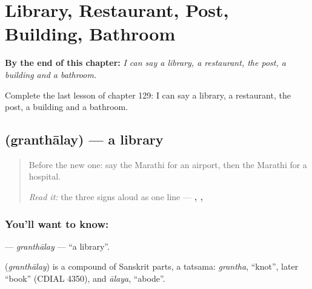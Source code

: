 
\chapter{Library, Restaurant, Post, Building, Bathroom}
\label{ch:mr-library-restaurant-post-building-bathroom}

\begin{chapteropening}
\textbf{By the end of this chapter:} \emph{I can say a library, a restaurant, the post, a building and a bathroom.}

Complete the last lesson of chapter 129: I can say a library, a restaurant, the post, a building and a bathroom.
\end{chapteropening}

\section[\texorpdfstring{\mr{ग्रंथालय} (granthālay)}{ग्रंथालय (granthālay)}]{ (granthālay) — a library}

\label{lesson:MR-C129-granthalay}



\begin{quote}
Before the new one: say the Marathi for an airport, then the Marathi for a hospital.

\emph{Read it:} the three signs aloud as one line — \textbf{, , }
\end{quote}

\subsection*{You'll want to know: }
\textbf{} — \emph{granthālay} — \textquotedblleft{}a library\textquotedblright{}.

\begin{cousinweb}
\textbf{} (\emph{granthālay}) is a compound of Sanskrit parts, a tatsama: \emph{grantha}, \textquotedblleft{}knot\textquotedblright{}, later \textquotedblleft{}book\textquotedblright{} (CDIAL 4350), and \emph{ālaya}, \textquotedblleft{}abode\textquotedblright{}.
\end{cousinweb}

